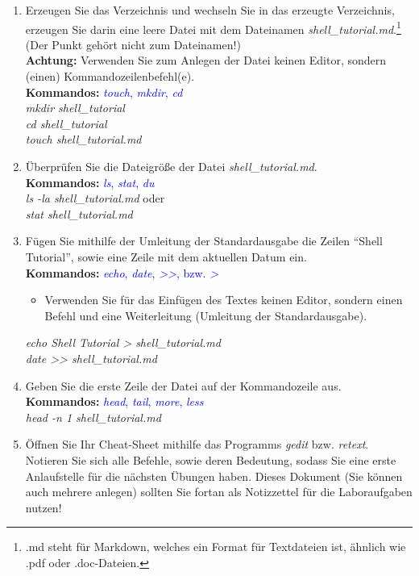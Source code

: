 \documentclass[paper=a4,fontsize=11pt]{scrartcl}%
\numberwithin{equation}{section}
\begin{document}
\begin{enumerate}
        \begin{enumerate}
        \item Erzeugen Sie das Verzeichnis  und wechseln Sie in das erzeugte Verzeichnis, erzeugen Sie darin eine leere Datei mit dem Dateinamen \textit{shell\_tutorial.md}.\footnote{.md steht für Markdown, welches ein Format für Textdateien ist, ähnlich wie .pdf oder .doc-Dateien.} (Der Punkt gehört nicht zum Dateinamen!)\\
        \textbf{Achtung:} Verwenden Sie zum Anlegen der Datei keinen Editor, sondern (einen) Kommandozeilenbefehl(e).\\
        \textbf{Kommandos:} \textcolor{blue}{\emph{touch}, \emph{mkdir}, \emph{cd}}\\
        \textit{mkdir shell\_tutorial}\\
		\textit{cd shell\_tutorial}\\
		\textit{touch shell\_tutorial.md}
		\item Überprüfen Sie die Dateigröße der Datei \textit{shell\_tutorial.md}.\\
		\textbf{Kommandos:} \textcolor{blue}{\emph{ls}, \emph{stat}, \emph{du}}\\
		\textit{ls -la shell\_tutorial.md} oder\\
		\textit{stat shell\_tutorial.md}
		\item Fügen Sie mithilfe der Umleitung der Standardausgabe die Zeilen \enquote{Shell Tutorial}, sowie eine Zeile mit dem aktuellen Datum ein.\\
		\textbf{Kommandos:} \textcolor{blue}{\emph{echo}, \emph{date}, \emph{>>}, bzw. \emph{>}}
		\begin{itemize}
			\item \small Verwenden Sie für das Einfügen des Textes keinen Editor, sondern einen Befehl und eine Weiterleitung (Umleitung der Standardausgabe).
		\end{itemize}
		\textit{echo Shell Tutorial > shell\_tutorial.md}\\
		\textit{date >> shell\_tutorial.md}
		\item Geben Sie die erste Zeile der Datei auf der Kommandozeile aus.\\
		\textbf{Kommandos:} \textcolor{blue}{\emph{head}, \emph{tail}, \emph{more}, \emph{less}}\\
		\textit{head -n 1 shell\_tutorial.md}
		\item Öffnen Sie Ihr Cheat-Sheet mithilfe das Programms \emph{gedit} bzw. \emph{retext}. Notieren Sie sich alle Befehle, sowie deren Bedeutung, sodass Sie eine erste Anlaufstelle für die nächsten Übungen haben. Dieses Dokument (Sie können auch mehrere anlegen) sollten Sie fortan als Notizzettel für die Laboraufgaben nutzen!

\end{enumerate}
\end{enumerate}
\end{document}
